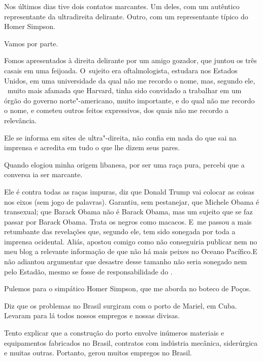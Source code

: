  

Nos últimos dias tive dois contatos marcantes. Um deles, com um
autêntico representante da ultradireita delirante. Outro, com um
representante típico do Homer Simpson.

 

Vamos por parte.

 

Fomos apresentados à direita delirante por um amigo gozador, que juntou
os três casais em uma feijoada. O~sujeito era oftalmologista, estudara
nos Estados Unidos, em uma universidade da qual não me recordo o nome,
mas, segundo ele, ~muito mais afamada que Harvard, tinha sido convidado
a trabalhar em um órgão do governo norte"-americano, muito importante, e
do qual não me recordo o nome, e cometeu outros feitos expressivos, dos
quais não me recordo a relevância.

 

Ele se informa em sites de ultra"-direita, não confia em nada do que sai
na imprensa e acredita em tudo o que lhe dizem seus pares.

 

Quando elogiou minha origem libanesa, por ser uma raça pura, percebi que
a conversa ia ser marcante.~

 

Ele é contra todas as raças impuras, diz que Donald Trump vai colocar as
coisas nos eixos (sem jogo de palavras). Garantiu, sem pestanejar, que
Michele Obama é transexual; que Barack Obama não é Barack Obama, mas um
sujeito que se faz passar por Barack Obama. Trata os negros como
macacos. E~me passou a mais retumbante das revelações que, segundo ele,
tem sido sonegada por toda a imprensa ocidental. Aliás, apostou comigo
como não conseguiria publicar nem no meu blog a relevante informação de
que não há mais peixes no Oceano Pacífico.E não adiantou argumentar que
desastre desse tamanho não seria sonegado nem pelo Estadão, mesmo se
fosse de responsabilidade do .

 

Pulemos para o simpático Homer Simpson, que me aborda no boteco de
Poços.

 

Diz que os problemas no Brasil surgiram com o porto de Mariel, em Cuba.
Levaram para lá todos nossos empregos e nossas divisas.

 

Tento explicar que a construção do porto envolve inúmeros materiais e
equipamentos fabricados no Brasil, contratos com indústria mecânica,
siderúrgica e muitas outras. Portanto, gerou muitos empregos no Brasil.

